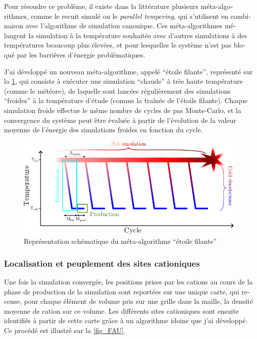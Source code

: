 \documentclass[thesis]{subfiles}
\begin{document}
\begin{otherlanguage}{french}
Pour résoudre ce problème, il existe dans la littérature plusieurs méta-algorithmes, comme le recuit simulé ou le \textit{parallel tempering}, qui s'utilisent en combinaison avec l'algorithme de simulation canonique. Ces méta-algorithmes mélangent la simulation à la température souhaitée avec d'autres simulations à des températures beaucoup plus élevées, et pour lesquelles le système n'est pas bloqué par les barrières d'énergie problématiques.

J'ai développé un nouveau méta-algorithme, appelé ``étoile filante'', représenté sur la \cref{fig_shootingstar}, qui consiste à exécuter une simulation ``chaude'' à très haute température (comme le météore), de laquelle sont lancées régulièrement des simulations ``froides'' à la température d'étude (comme la traînée de l'étoile filante). Chaque simulation froide effectue le même nombre de cycles de pas Monte-Carlo, et la convergence du système peut être évaluée à partir de l'évolution de la valeur moyenne de l'énergie des simulations froides en fonction du cycle.

\begin{figure}
	\centering
	\includegraphics[width=\linewidth]{figures/cations/shootingstar.pdf}
	\caption{Représentation schématique du méta-algorithme ``étoile filante''}\label{fig_shootingstar}
\end{figure}

\subsubsection{Localisation et peuplement des sites cationiques}

Une fois la simulation convergée, les positions prises par les cations au cours de la phase de production de la simulation sont reportées sur une unique carte, qui recense, pour chaque élément de volume pris sur une grille dans la maille, la densité moyenne de cation sur ce volume. Les différents sites cationiques sont ensuite identifiés à partir de cette carte grâce à un algorithme idoine que j'ai développé. Ce procédé est illustré sur la \cref{fig_FAU}.


\end{otherlanguage}
\end{document}
